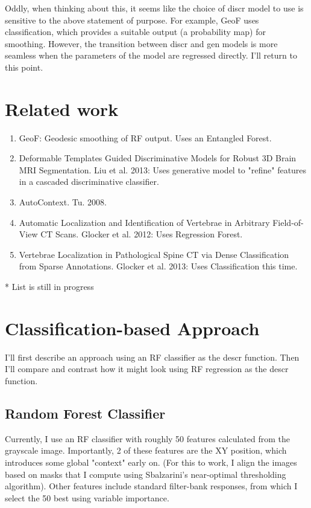 \documentclass[10pt,twocolumn,letterpaper]{article}
\begin{document}
Oddly, when thinking about this, it seems like the choice of discr model to use is sensitive to the above statement of purpose.  For example, GeoF uses classification, which provides a suitable output (a probability map) for smoothing.  However, the transition between discr and gen models is more seamless when the parameters of the model are regressed directly.  I'll return to this point.

\section{Related work}

\begin{enumerate}
\item GeoF: Geodesic smoothing of RF output.  Uses an Entangled Forest.
\item Deformable Templates Guided Discriminative Models for Robust 3D Brain MRI Segmentation.  Liu et al.  2013: Uses generative model to "refine" features in a cascaded discriminative classifier.
\item AutoContext.  Tu.  2008.
\item Automatic Localization and Identification of Vertebrae in Arbitrary Field-of-View CT Scans.  Glocker et al.  2012: Uses Regression Forest.
\item Vertebrae Localization in Pathological Spine CT via Dense Classification from Sparse Annotations.  Glocker et al.  2013: Uses Classification this time.
\end{enumerate}
* List is still in progress

\section{Classification-based Approach}

I'll first describe an approach using an RF classifier as the descr function.  Then I'll compare and contrast how it might look using RF regression as the descr function.

\subsection{Random Forest Classifier}

Currently, I use an RF classifier with roughly 50 features calculated from the grayscale image.  Importantly, 2 of these features are the XY position, which introduces some global "context" early on.  (For this to work, I align the images based on masks that I compute using Sbalzarini's near-optimal thresholding algorithm).  Other features include standard filter-bank responses, from which I select the 50 best using variable importance.
\end{document}
